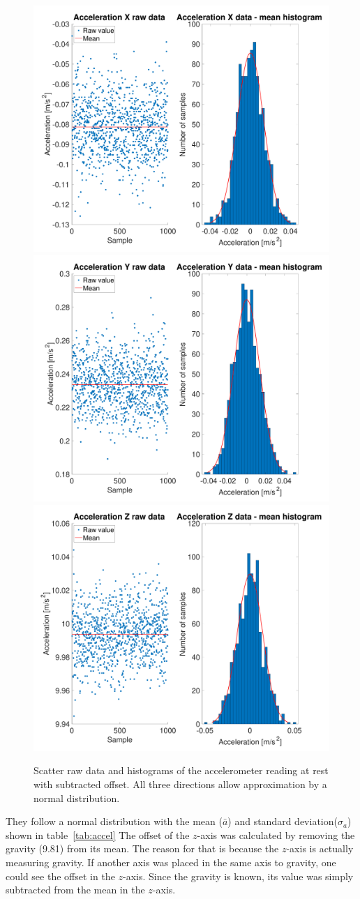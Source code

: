 \documentclass[DIV=14]{scrartcl}
\begin{document}
    \begin{figure}[h]

        \centering
        \includegraphics[width=.45\textwidth]{plots/plotAccelerationX}\hfill
        \includegraphics[width=.45\textwidth]{plots/plotAccelerationY}\vspace{1em}
        \includegraphics[width=.45\textwidth]{plots/plotAccelerationZ}\hfill
        \caption{Scatter raw data and histograms of the accelerometer reading at rest with subtracted offset. All three directions allow approximation by a normal distribution.}
        \label{fig:accelerationHist}
    \end{figure}


    They follow a normal distribution with the mean ($\bar{\mathit{a}}$) and standard deviation($\sigma_a$) shown in table~\ref{tab:accel}
    The offset of the $z$-axis was calculated by removing the gravity (9.81) from its mean.
    The reason for that is because the $z$-axis is actually measuring gravity.
    If another axis was placed in the same axis to gravity, one could see the offset in the $z$-axis.
    Since the gravity is known, its value was simply subtracted from the mean in the $z$-axis.
\end{document}
